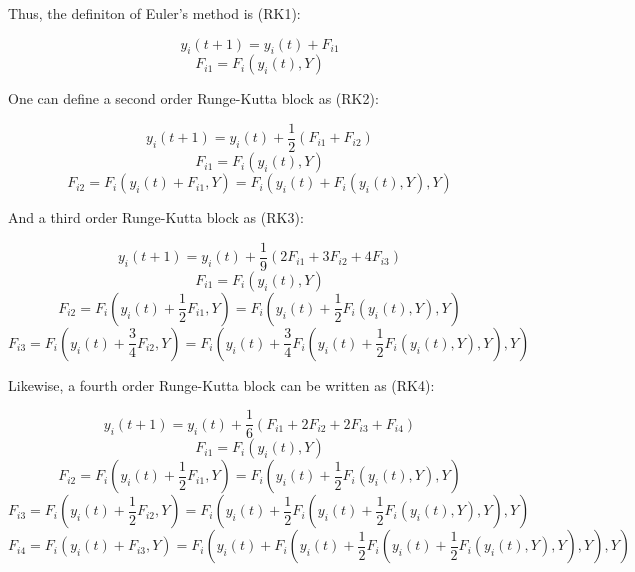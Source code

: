 \documentclass[12pt,a4paper]{report}
\begin{document}
Thus, the definiton of Euler's method is (RK1):

\begin{equation}
  y_i(t + 1) = y_i(t) + F_{i1}
\end{equation}
\begin{equation}
  F_{i1} = F_i(y_i(t), Y)
\end{equation}

One can define a second order Runge-Kutta block as (RK2):

\begin{equation}
  y_i(t + 1) = y_i(t) + \frac{1}{2}(F_{i1} + F_{i2})
\end{equation}
\begin{equation}
  F_{i1} = F_i(y_i(t), Y)
\end{equation}
\begin{equation}
  F_{i2} = F_i(y_i(t) + F_{i1}, Y) = F_i(y_i(t) + F_i(y_i(t), Y), Y)
\end{equation}

And a third order Runge-Kutta block as (RK3):

\begin{equation}
  y_i(t + 1) = y_i(t) + \frac{1}{9}(2F_{i1} + 3F_{i2} + 4F_{i3})
\end{equation}
\begin{equation}
  F_{i1} = F_i(y_i(t), Y)
\end{equation}
\begin{equation}
  F_{i2} = F_i(y_i(t) + \frac{1}{2}F_{i1}, Y) = F_i(y_i(t) + \frac{1}{2}F_i(y_i(t), Y), Y)
\end{equation}
\begin{equation}
  F_{i3} = F_i(y_i(t) + \frac{3}{4}F_{i2}, Y) = F_i(y_i(t) + \frac{3}{4}F_i(y_i(t) + \frac{1}{2}F_i(y_i(t), Y), Y), Y)
\end{equation}

Likewise, a fourth order Runge-Kutta block can be written as (RK4):

\begin{equation}
  y_i(t + 1) = y_i(t) + \frac{1}{6}(F_{i1} + 2F_{i2} + 2F_{i3} + F_{i4})
\end{equation}
\begin{equation}
  F_{i1} = F_i(y_i(t), Y)
\end{equation}
\begin{equation}
  F_{i2} = F_i(y_i(t) + \frac{1}{2}F_{i1}, Y) = F_i(y_i(t) + \frac{1}{2}F_i(y_i(t), Y), Y)
\end{equation}
\begin{equation}
  F_{i3} = F_i(y_i(t) + \frac{1}{2}F_{i2}, Y) = F_i(y_i(t) + \frac{1}{2}F_i(y_i(t) + \frac{1}{2}F_i(y_i(t), Y), Y), Y)
\end{equation}
\begin{equation}
  F_{i4} = F_i(y_i(t) + F_{i3}, Y) = F_i(y_i(t) + F_i(y_i(t) + \frac{1}{2}F_i(y_i(t) + \frac{1}{2}F_i(y_i(t), Y), Y), Y), Y)
\end{equation}
\end{document}
